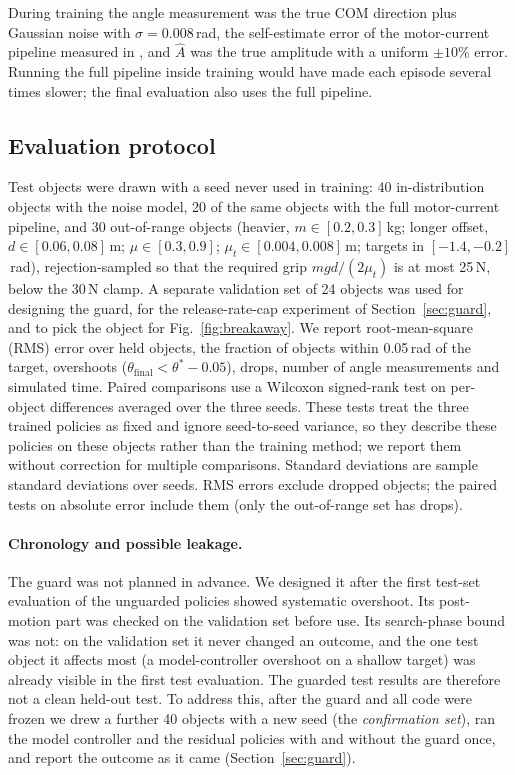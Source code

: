 \documentclass[11pt]{article}
\begin{document}
During training the angle measurement was the true COM direction plus Gaussian noise with $\sigma=0.008$\,rad, the self-estimate error of the motor-current pipeline measured in \cite{aidoo2026a}, and $\hat A$ was the true amplitude with a uniform $\pm10\%$ error. Running the full pipeline inside training would have made each episode several times slower; the final evaluation also uses the full pipeline.

\subsection{Evaluation protocol}
Test objects were drawn with a seed never used in training: 40 in-distribution objects with the noise model, 20 of the same objects with the full motor-current pipeline, and 30 out-of-range objects (heavier, $m\in[0.2,0.3]$\,kg; longer offset, $d\in[0.06,0.08]$\,m; $\mu\in[0.3,0.9]$; $\mu_t\in[0.004,0.008]$\,m; targets in $[-1.4,-0.2]$\,rad), rejection-sampled so that the required grip $mgd/(2\mu_t)$ is at most 25\,N, below the 30\,N clamp. A separate validation set of 24 objects was used for designing the guard, for the release-rate-cap experiment of Section~\ref{sec:guard}, and to pick the object for Fig.~\ref{fig:breakaway}. We report root-mean-square (RMS) error over held objects, the fraction of objects within 0.05\,rad of the target, overshoots ($\theta_{\text{final}}<\theta^*-0.05$), drops, number of angle measurements and simulated time. Paired comparisons use a Wilcoxon signed-rank test on per-object differences averaged over the three seeds. These tests treat the three trained policies as fixed and ignore seed-to-seed variance, so they describe these policies on these objects rather than the training method; we report them without correction for multiple comparisons. Standard deviations are sample standard deviations over seeds. RMS errors exclude dropped objects; the paired tests on absolute error include them (only the out-of-range set has drops).

\paragraph{Chronology and possible leakage.} The guard was not planned in advance. We designed it after the first test-set evaluation of the unguarded policies showed systematic overshoot. Its post-motion part was checked on the validation set before use. Its search-phase bound was not: on the validation set it never changed an outcome, and the one test object it affects most (a model-controller overshoot on a shallow target) was already visible in the first test evaluation. The guarded test results are therefore not a clean held-out test. To address this, after the guard and all code were frozen we drew a further 40 objects with a new seed (the \emph{confirmation set}), ran the model controller and the residual policies with and without the guard once, and report the outcome as it came (Section~\ref{sec:guard}).
\end{document}
